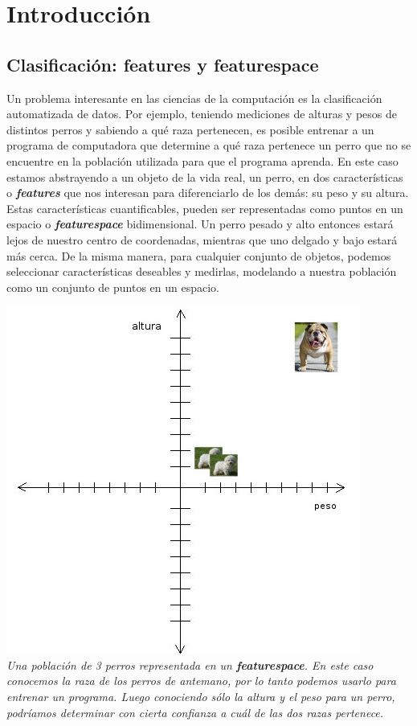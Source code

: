 \section{Introducción}

\subsection{Clasificación: features y featurespace}
Un problema interesante en las ciencias de la computación es la clasificación automatizada de datos. Por ejemplo, teniendo mediciones de alturas y pesos de distintos perros y sabiendo a qué raza pertenecen, es posible entrenar a un programa de computadora que determine a qué raza pertenece un perro que no se encuentre en la población utilizada para que el programa aprenda. En este caso estamos abstrayendo a un objeto de la vida real, un perro, en dos características o \textbf{\textit{features}} que nos interesan para diferenciarlo de los demás: su peso y su altura. Estas características cuantificables, pueden ser representadas como puntos en un espacio o \textbf{\textit{featurespace}} bidimensional. Un perro pesado y alto entonces estará lejos de nuestro centro de coordenadas, mientras que uno delgado y bajo estará más cerca. De la misma manera, para cualquier conjunto de objetos, podemos seleccionar características deseables y medirlas, modelando a nuestra población como un conjunto de puntos en un espacio.

\begin{center}
\includegraphics[scale=0.44]{imagenes/eje.jpg}
\\
\vspace{1pt}
\footnotesize\textit{Una población de 3 perros representada en un \textbf{\textit{featurespace}}. En este caso conocemos la raza de los perros de antemano, por lo tanto podemos usarlo para entrenar un programa. Luego conociendo sólo la altura y el peso para un perro, podríamos determinar con cierta confianza a cuál de las dos razas pertenece.}
\end{center}

